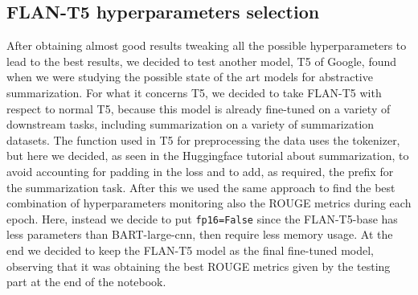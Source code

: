 \documentclass[10pt,twocolumn,letterpaper]{article}
\begin{document}
\subsection{FLAN-T5 hyperparameters selection}
After obtaining almost good results tweaking all the possible hyperparameters to lead to the best results, we decided to test another model, T5 of Google, found when we were studying the possible state of the art models for abstractive summarization.
For what it concerns T5, we decided to take FLAN-T5 with respect to normal T5, because this model is already fine-tuned on a variety of downstream tasks, including 
summarization on a variety of summarization datasets.
The function used in T5 for preprocessing the data uses the tokenizer, but here we decided, as seen in the Huggingface tutorial about summarization, to avoid accounting for padding in the loss and to add, as required, the prefix for the summarization task.
After this we used the same approach to find the best combination of hyperparameters monitoring also the ROUGE metrics during each epoch.
Here, instead we decide to put \texttt{fp16=False} since the FLAN-T5-base has less parameters than BART-large-cnn, then require less memory usage.
At the end we decided to keep the FLAN-T5 model as the final fine-tuned model, observing that it was obtaining the best ROUGE metrics given by the testing part at the end of the notebook.
\end{document}
